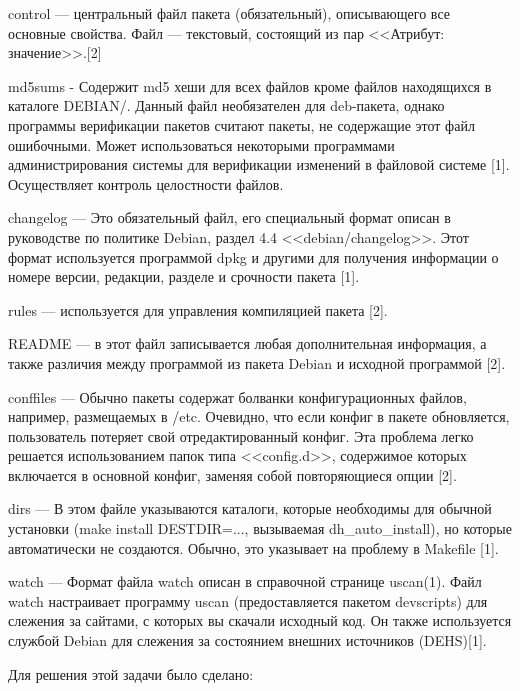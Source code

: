 control --- центральный файл пакета (обязательный), описывающего все основные свойства. Файл --- текстовый, состоящий из пар <<Атрибут: значение>>.[2]

md5sums - Содержит md5 хеши для всех файлов кроме файлов находящихся в каталоге DEBIAN/. Данный файл необязателен для deb-пакета, 
однако программы верификации пакетов считают пакеты, не содержащие этот файл ошибочными. Может использоваться некоторыми программами администрирования системы для верификации изменений в файловой системе [1]. Осуществляет контроль целостности файлов.

changelog --- Это обязательный файл, его специальный формат описан в руководстве по политике Debian, раздел 4.4 <<debian/changelog>>. Этот формат используется программой dpkg и другими для получения информации о номере версии, редакции, разделе и срочности пакета [1].

rules --- используется для управления компиляцией пакета [2].

README --- в этот файл записывается любая дополнительная информация, а также различия между программой из пакета Debian и исходной программой [2].

conffiles --- Обычно пакеты содержат болванки конфигурационных файлов, например, размещаемых в /etc. Очевидно, что если конфиг в пакете обновляется, пользователь потеряет свой отредактированный конфиг. Эта проблема легко решается использованием папок типа <<config.d>>, содержимое которых включается в основной конфиг, заменяя собой повторяющиеся опции [2].

dirs --- В этом файле указываются каталоги, которые необходимы для обычной установки (make install DESTDIR=..., вызываемая dh\_auto\_install), но которые автоматически не создаются. Обычно, это указывает на проблему в Makefile [1].

watch --- Формат файла watch описан в справочной странице uscan(1). Файл watch настраивает программу uscan (предоставляется пакетом devscripts) для слежения за сайтами, с которых вы скачали исходный код. Он также используется службой Debian для слежения за состоянием внешних источников (DEHS)[1].

Для решения этой задачи было сделано:

